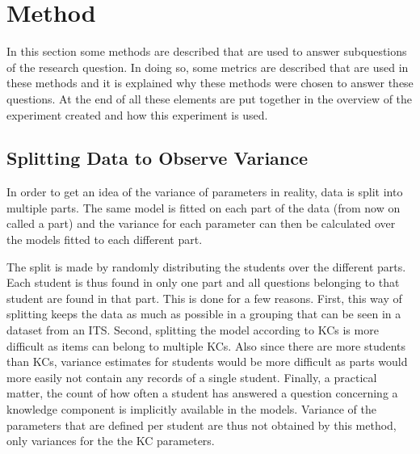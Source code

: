 \documentclass{scrartcl}
\begin{document}
\section{Method}

In this section some methods are described that are used to answer subquestions of the research question. In doing so, some metrics are described that are used in these methods and it is explained why these methods were chosen to answer these questions. At the end of all these elements are put together in the overview of the experiment created and how this experiment is used.

\subsection{Splitting Data to Observe Variance}
\label{sec:splits}
In order to get an idea of the variance of parameters in reality, data is split into multiple parts. The same model is fitted on each part of the data (from now on called a part) and the variance for each parameter can then be calculated over the models fitted to each different part. 

The split is made by randomly distributing the students over the different parts. Each student is thus found in only one part and all questions belonging to that student are found in that part. This is done for a few reasons. First, this way of splitting keeps the data as much as possible in a grouping that can be seen in a dataset from an ITS.  Second, splitting the model according to KCs is more difficult as items can belong to multiple KCs. Also since there are more students than KCs, variance estimates for students would be more difficult as parts would more easily not contain any records of a single student. Finally, a practical matter, the count of how often a student has answered a question concerning a knowledge component is implicitly available in the models. Variance of the parameters that are defined per student are thus not obtained by this method, only variances for the the KC parameters.
\end{document}
